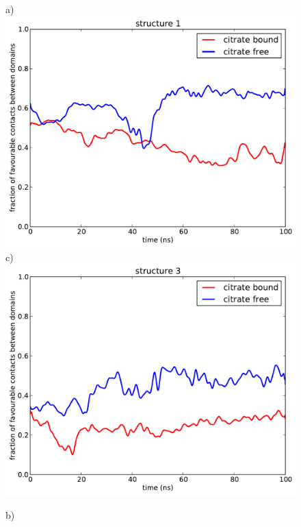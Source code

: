 \documentclass[english, a4paper, 12pt, titlepage, draft]{article}
\begin{document}
\begin{figure}
    \begin{minipage}[]{0.45\linewidth}
        \centering
        a)
        \includegraphics[width=\textwidth]{figures/Complex_hydrophobic_core/favourable_cont_structure1.pdf}  
        c)
        \includegraphics[width=\textwidth]{figures/Complex_hydrophobic_core/favourable_cont_structure3.pdf}  
    \end{minipage}
\hspace{0.5cm}
    \begin{minipage}[]{0.45\linewidth}
        \centering
        b)

\end{minipage}
\end{figure}
\end{document}
